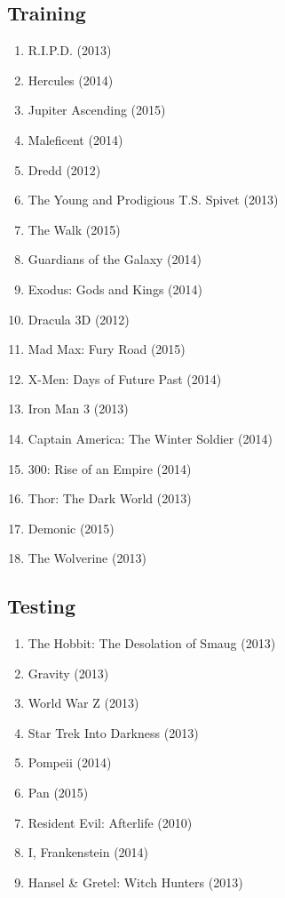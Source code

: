 \documentclass{article}
\begin{document}
\subsection{Training}
\begin{enumerate}
\item R.I.P.D. (2013)
\item Hercules (2014) 
\item Jupiter Ascending (2015)
\item Maleficent (2014) 
\item Dredd (2012)
\item The Young and Prodigious T.S. Spivet (2013)
\item The Walk (2015) 
\item Guardians of the Galaxy (2014)
\item Exodus: Gods and Kings (2014) 
\item Dracula 3D (2012)
\item Mad Max: Fury Road (2015)
\item X-Men: Days of Future Past (2014)
\item Iron Man 3 (2013) 
\item Captain America: The Winter Soldier (2014)
\item 300: Rise of an Empire (2014)
\item Thor: The Dark World (2013)
\item Demonic (2015) 
\item The Wolverine (2013)
\end{enumerate}

\subsection{Testing}
\begin{enumerate}
\item The Hobbit: The Desolation of Smaug (2013)
\item Gravity (2013)
\item World War Z (2013)
\item Star Trek Into Darkness (2013) 
\item Pompeii (2014) 
\item Pan (2015)
\item Resident Evil: Afterlife (2010)
\item I, Frankenstein (2014) 
\item Hansel \& Gretel: Witch Hunters (2013)
\end{enumerate}
\end{document}
